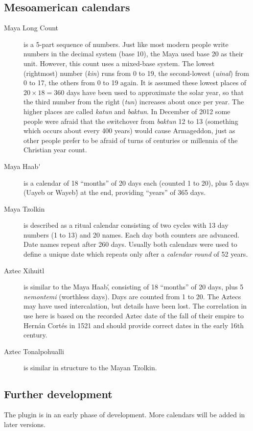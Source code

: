\subsection{Mesoamerican calendars}
\begin{description}
\item[Maya Long Count] is a 5-part sequence of numbers. Just like most
  modern people write numbers in the decimal system (base 10), the
  Maya used base 20 as their unit. However, this count uses a
  mixed-base system. The lowest (rightmost) number (\emph{kin}) runs
  from 0 to 19, the second-lowest (\emph{uinal}) from 0 to 17, the
  others from 0 to 19 again. It is assumed these lowest places of
  $20\times18=360$ days have been used to approximate the solar year,
  so that the third number from the right (\emph{tun}) increases about
  once per year. The higher places are called \emph{katun} and
  \emph{baktun}. In December of 2012 some people were afraid that the
  switchover from \emph{baktun} 12 to 13 (something which occurs about
  every 400 years) would cause Armageddon, just as other people prefer
  to be afraid of turns of centuries or millennia of the Christian
  year count.
\item[Maya Haab\'] is a calendar of 18 ``months'' of 20 days each
  (counted 1 to 20), plus 5 days (Uayeb or Wayeb\') at the end, providing
  ``years'' of 365 days.
\item[Maya Tzolkin] is described as a ritual calendar consisting of two
  cycles with 13 day numbers (1 to 13) and 20 names. Each day both
  counters are advanced. Date names repeat after 260 days. Usually
  both calendars were used to define a unique date which repeats only
  after a \emph{calendar round} of 52 years.
\item[Aztec Xihuitl] is similar to the Maya Haab\', consisting of 18
  ``months'' of 20 days, plus 5 \emph{nemontemi} (worthless
  days). Days are counted from 1 to 20. The Aztecs may have used
  intercalation, but details have been lost. The correlation in use
  here is based on the recorded Aztec date of the fall of their empire
  to Hern\'an Cort\'es in 1521 and should provide correct dates in the
  early 16th century.
\item[Aztec Tonalpohualli] is similar in structure to the Mayan Tzolkin.
\end{description}

\subsection{Further development}
The plugin is in an early phase of development. More calendars will be added in later versions. 



